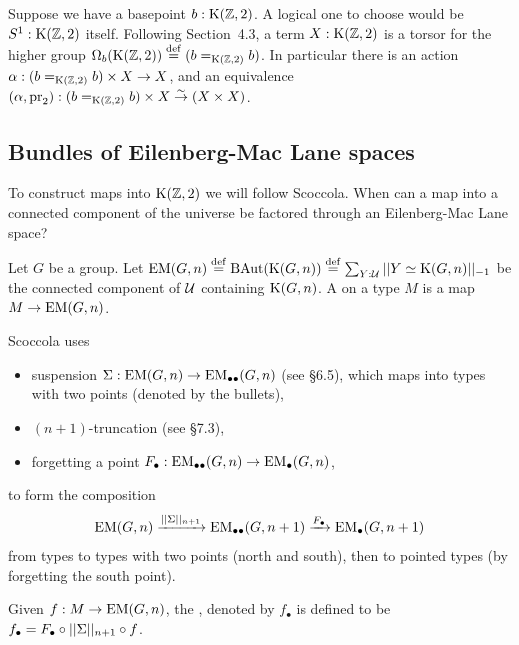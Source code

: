 Suppose we have a basepoint \( b:\mathrm{K}(\mathbb{Z},2) \). A logical one to choose would be \( S^1:\mathrm{K}(\mathbb{Z},2) \) itself. Following \cite{buchholtz2023central} Section~4.3, a term \( X : \mathrm{K}(\mathbb{Z},2) \) is a torsor for the higher group \( \Omega_b(\mathrm{K}(\mathbb{Z},2))\stackrel{\mathrm{def}}{=} (b=_{\mathrm{K}(\mathbb{Z},2)} b) \). In particular there is an action \( \alpha:(b=_{\mathrm{K}(\mathbb{Z},2)}b)\times X\to X \), and an equivalence \( (\alpha, \mathrm{pr}_2) : (b=_{\mathrm{K}(\mathbb{Z},2)}b)\times X\stackrel{\sim}{\to} (X\times X)\).


\subsection{Bundles of Eilenberg-Mac Lane spaces}

To construct maps into \( \mathrm{K}(\mathbb{Z},2) \) we will follow Scoccola\cite{sco}. When can a map into a connected component of the universe be factored through an Eilenberg-Mac Lane space?

\begin{mydef}
Let \( G \) be a group. Let \( \mathrm{EM}(G,n)\stackrel{\mathrm{def}}{=} \operatorname{BAut}(\mathrm{K}(G,n))\stackrel{\mathrm{def}}{=} \sum_{Y:\mathcal{U}}||Y\simeq \mathrm{K}(G,n)||_{-1}\) be the connected component of \( \mathcal{U} \) containing \( \mathrm{K}(G,n) \). A  on a type \( M \) is a map \( M\to\mathrm{EM}(G,n) \).
\end{mydef}

Scoccola uses 
\begin{itemize}
\item suspension \( \Sigma:\mathrm{EM}(G,n)\to\mathrm{EM}_{\bullet\bullet}(G,n) \) (see \cite{hottbook} §6.5), which maps into types with two points (denoted by the bullets),
\item \( (n+1) \)-truncation (see \cite{hottbook} §7.3),
\item forgetting a point \( F_\bullet:\mathrm{EM}_{\bullet\bullet}(G,n)\to \mathrm{EM}_{\bullet}(G,n) \),
\end{itemize}
to form the composition
\[ 
\mathrm{EM}(G,n)\xrightarrow[]{||\Sigma||_{n+1}} \mathrm{EM}_{\bullet\bullet}(G,n+1)\xrightarrow[]{F_\bullet}\mathrm{EM_{\bullet}}(G,n+1)
\]
from types to types with two points (north and south), then to pointed types (by forgetting the south point).

\begin{mydef}
Given \( f:M\to\mathrm{EM}(G,n) \), the , denoted by \( f_\bullet \) is defined to be \( f_\bullet=F_\bullet\circ||\Sigma||_{n+1}\circ f \).
\end{mydef}

